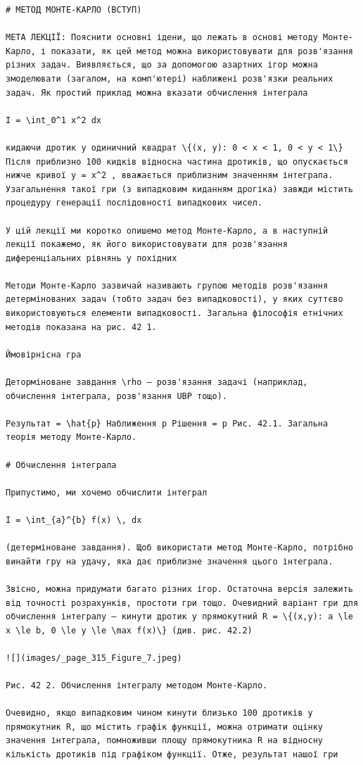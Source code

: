 \documentclass[
  ukrainian,
]{article}
\begin{document}
\begin{verbatim}
# МЕТОД МОНТЕ-КАРЛО (ВСТУП)

МЕТА ЛЕКЦІЇ: Пояснити основні ідени, що лежать в основі методу Монте-Карло, і показати, як цей метод можна використовувати для розв'язання різних задач. Виявляється, що за допомогою азартних ігор можна змоделювати (загалом, на комп'ютері) наближені розв'язки реальних задач. Як простий приклад можна вказати обчислення інтеграла

I = \int_0^1 x^2 dx

кидаючи дротик у одиничний квадрат \{(x, y): 0 < x < 1, 0 < y < 1\} Після приблизно 100 кидків відносна частина дротиків, що опускається нижче кривої y = x^2 , вважається приблизним значенням інтеграла. Узагальнення такої гри (з випадковим киданням дрогіка) завжди містить процедуру генерації послідовності випадкових чисел.

У цій лекції ми коротко опишемо метод Монте-Карло, а в наступній лекції покажемо, як його використовувати для розв'язання диференціальних рівнянь у похідних

Методи Монте-Карло зазвичай називають групою методів розв'язання детермінованих задач (тобто задач без випадковості), у яких суттєво використовуються елементи випадковості. Загальна філософія етнічних методів показана на рис. 42 1.

Ймовірнісна гра

Деторміноване завдання \rho — розв'язання задачі (наприклад, обчислення інтеграла, розв'язання UBP тощо).

Результат = \hat{p} Наближення p Рішення = p Рис. 42.1. Загальна теорія методу Монте-Карло.

# Обчислення інтеграла

Припустимо, ми хочемо обчислити інтеграл

I = \int_{a}^{b} f(x) \, dx

(детерміноване завдання). Щоб використати метод Монте-Карло, потрібно винайти гру на удачу, яка дає приблизне значення цього інтеграла.

Звісно, можна придумати багато різних ігор. Остаточна версія залежить від точності розрахунків, простоти гри тощо. Очевидний варіант гри для обчислення інтегралу — кинути дротик у прямокутний R = \{(x,y): a \le x \le b, 0 \le y \le \max f(x)\} (див. рис. 42.2)

![](images/_page_315_Figure_7.jpeg)

Рис. 42 2. Обчислення інтегралу методом Монте-Карло.

Очевидно, якщо випадковим чином кинути близько 100 дротиків у прямокутник R, що містить графік функції, можна отримати оцінку значення інтеграла, помноживши площу прямокутника R на відносну кількість дротиків під графіком функції. Отже, результат нашої гри


\end{verbatim}
\end{document}
